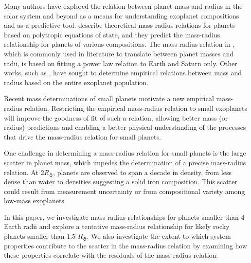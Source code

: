 \documentclass[iop]{emulateapj}
\newcommand{\rearth}{\ensuremath{R_\earth}}
\begin{document}
Many authors have explored the relation between planet mass and radius in the solar system and beyond as a means for understanding exoplanet compositions and as a predictive tool.  \citet{Seager2007} describe theoretical mass-radius relations for planets based on polytropic equations of state, and they predict the mass-radius relationship for  planets of various compositions.  The mass-radius relation in \citet{Lissauer2011}, which is commonly used in literature to translate between planet masses and radii, is based on fitting a power law relation to Earth and Saturn only.  Other works, such as \citet{Enoch2012, Kane2012, Weiss2013}, have sought to determine empirical relations between mass and radius based on the entire exoplanet population.  

Recent mass determinations of small planets motivate a new empirical mass-radius relation.  Restricting the empirical mass-radius relation to small exoplanets will improve the goodness of fit of such a relation, allowing better mass (or radius) predictions and enabling a better physical understanding of the processes that drive the mass-radius relation for small planets.  

One challenge in determining a mass-radius relation for small planets is the large scatter in planet mass, which impedes the determination of a precise mass-radius relation.  At 2\rearth, planets are observed to span a decade in density, from less dense than water to densities suggesting a solid iron composition.  This scatter could result from measurement uncertainty or from compositional variety among low-mass exoplanets.

In this paper, we investigate mass-radius relationships for planets smaller than 4 Earth radii and explore a tentative mass-radius relationship for likely rocky planets smaller than 1.5 \rearth.  We also investigate the extent to which system properties contribute to the scatter in the mass-radius relation by examining how these properties correlate with the residuals of the mass-radius relation.

\end{document}
